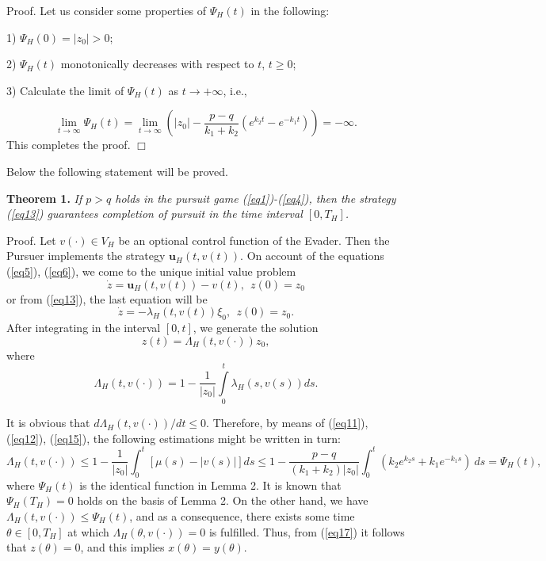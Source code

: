 \documentclass[10 pt]{book}
\begin{document}
{\sf Proof. }
Let us consider some properties of $\Psi_{H}(t)$ in the following:

1) $\Psi_{H}(0)=|z_{0}|>0$;

2) $\Psi_{H}(t)$ monotonically decreases with respect to $t$, $t\geq0$;

3) Calculate the limit of $\Psi_{H}(t)$ as $t\rightarrow +\infty$, i.e.,


$$\lim_{t\rightarrow \infty}\Psi_{H}(t)=\lim_{t\rightarrow \infty} \left(|z_{0}| -\frac{p-q}{k_{1}+k_{2}} (e^{k_{2}t}-e^{-k_{1}t})\right)=-\infty.$$
This completes the proof.
\hfill$\Box$ \

Below the following statement will be proved.

\textbf{Theorem 1.} \emph{ If $p > q$ holds in the pursuit game (\ref{eq1})-(\ref{eq4}), then the strategy (\ref{eq13}) guarantees completion of pursuit in the time interval $[0, T_{H}]$.}

\medskip

{\sf Proof. } Let $v(\cdot)\in V_{H}$ be an optional control function of
the Evader. Then the Pursuer implements the strategy $\textbf{u}_{H}(t, v(t))$. On account of the equations
(\ref{eq5}), (\ref{eq6}), we come to the unique initial value
problem
$$
\dot{z}=\textbf{u}_{H}(t,v(t))-v(t), \
\ z(0)=z_{0}
$$
or from (\ref{eq13}), the last equation will be
$$
\dot{z}=-\lambda_{H}(t,v(t))\xi_0, \
\ z(0)=z_{0}.
$$
After integrating in the interval $[0, t]$, we generate the solution
\begin{equation}\label{eq17}
z(t) = \Lambda_{H}(t,v(\cdot))z_{0},
\end{equation}
where
$$
\Lambda_{H}(t,v(\cdot))=1-  \frac{1}{|z_{0}|}
\int\limits_{0}^{t}\lambda_{H}(s,v(s))ds.
$$

It is obvious that $d\Lambda_{H}(t,v(\cdot))/dt\leq0$. Therefore, by means of (\ref{eq11}), (\ref{eq12}), (\ref{eq15}), the following estimations might be written in turn:
$$ \Lambda_{H}(t,v(\cdot)) \leq 1-\frac{1}{|z_{0}|}\int_{0}^{t}[\mu(s)- |v(s)|]ds\leq 1-\frac{p-q}{(k_{1}+k_{2})|z_{0}|}\int_{0}^{t} (k_{2}e^{k_{2}s}+k_{1}e^{-k_{1}s}) \ ds=\Psi_{H}(t),$$
where $\Psi_{H}(t)$ is the identical function in Lemma 2.
It is known that $\Psi_{H}(T_{H})=0$ holds on the basis of Lemma 2. On the other hand, we have $ \Lambda_{H}(t,v(\cdot)) \leq\Psi_{H}(t)$, and as a consequence, there exists some time $\theta\in[0, T_{H}]$ at which $\Lambda_{H}(\theta, v(\cdot))=0$ is fulfilled. Thus, from (\ref{eq17}) it follows that $z(\theta)=0$, and this implies $x(\theta)=y(\theta)$.
\end{document}
